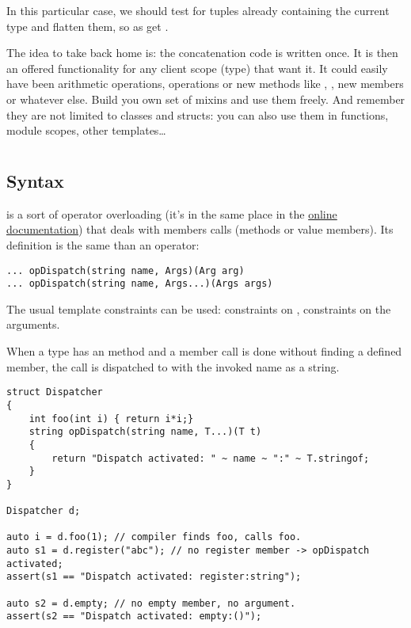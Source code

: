 In this particular case, we should test for tuples already containing the current type and flatten them, so as get .

The idea to take back home is: the concatenation code is written once. It is then an offered functionality for any client scope (type) that want it. It could easily have been arithmetic operations,  operations or new methods like , , new members or whatever else. Build you own set of mixins and use them freely. And remember they are not limited to classes and structs: you can also use them in functions, module scopes, other templates\ldots


\section{} \label{opdispatch}

\subsection{Syntax}\label{opdispatchsyntax}

 is a sort of operator overloading (it's in the same place in the \href{www.d-programming-language.org/operator.html}{online documentation}) that deals with members calls (methods or value members). Its definition is the same than an operator:

\begin{verbatim}
... opDispatch(string name, Args)(Arg arg)
... opDispatch(string name, Args...)(Args args)
\end{verbatim}

The usual template constraints can be used: constraints on , constraints on the arguments.

When a type has an  method and a member call is done without finding a defined member, the call is dispatched to  with the invoked name as a string.

\begin{verbatim}
struct Dispatcher
{
    int foo(int i) { return i*i;}
    string opDispatch(string name, T...)(T t)
    {
        return "Dispatch activated: " ~ name ~ ":" ~ T.stringof;
    }
}

Dispatcher d;

auto i = d.foo(1); // compiler finds foo, calls foo.
auto s1 = d.register("abc"); // no register member -> opDispatch activated;
assert(s1 == "Dispatch activated: register:string");

auto s2 = d.empty; // no empty member, no argument.
assert(s2 == "Dispatch activated: empty:()");
\end{verbatim}

